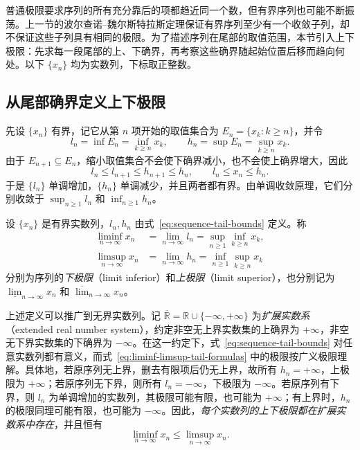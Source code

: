 普通极限要求序列的所有充分靠后的项都趋近同一个数，但有界序列也可能不断振荡。上一节的波尔查诺--魏尔斯特拉斯定理保证有界序列至少有一个收敛子列，却不保证这些子列具有相同的极限。为了描述序列在尾部的取值范围，本节引入上下极限：先求每一段尾部的上、下确界，再考察这些确界随起始位置后移而趋向何处。以下 $\{x_n\}$ 均为实数列，下标取正整数。

\subsection{从尾部确界定义上下极限}
\label{subsec:liminf-limsup-definitions}

先设 $\{x_n\}$ 有界，记它从第 $n$ 项开始的取值集合为 $E_n=\{x_k:k\geq n\}$，并令
\begin{equation}
    l_n=\inf E_n=\inf_{k\geq n}x_k,
    \qquad h_n=\sup E_n=\sup_{k\geq n}x_k.
    \label{eq:sequence-tail-bounds}
\end{equation}
由于 $E_{n+1}\subseteq E_n$，缩小取值集合不会使下确界减小，也不会使上确界增大，因此
\[
    l_n\leq l_{n+1}\leq h_{n+1}\leq h_n,
    \qquad l_n\leq x_n\leq h_n.
\]
于是 $\{l_n\}$ 单调增加，$\{h_n\}$ 单调减少，并且两者都有界。由单调收敛原理，它们分别收敛于 $\sup_{n\geq1}l_n$ 和 $\inf_{n\geq1}h_n$。

\begin{definition}
\label{def:liminf-limsup}
设 $\{x_n\}$ 是有界实数列，$l_n,h_n$ 由式~\eqref{eq:sequence-tail-bounds} 定义。称
\begin{equation}
    \begin{aligned}
        \liminf_{n\to\infty}x_n
        &=\lim_{n\to\infty}l_n
        =\sup_{n\geq1}\inf_{k\geq n}x_k,\\
        \limsup_{n\to\infty}x_n
        &=\lim_{n\to\infty}h_n
        =\inf_{n\geq1}\sup_{k\geq n}x_k
    \end{aligned}
    \label{eq:liminf-limsup-tail-formulas}
\end{equation}
分别为序列的\emph{下极限}（limit inferior）和\emph{上极限}（limit superior），也分别记为 $\underline{\lim}_{n\to\infty}x_n$ 和 $\overline{\lim}_{n\to\infty}x_n$。
\end{definition}

上述定义可以推广到无界实数列。记 $\overline{\mathbb{R}}=\mathbb{R}\cup\{-\infty,+\infty\}$ 为\emph{扩展实数系}（extended real number system），约定非空无上界实数集的上确界为 $+\infty$，非空无下界实数集的下确界为 $-\infty$。在这一约定下，式~\eqref{eq:sequence-tail-bounds} 对任意实数列都有意义，而式~\eqref{eq:liminf-limsup-tail-formulas} 中的极限按广义极限理解。具体地，若原序列无上界，删去有限项后仍无上界，故所有 $h_n=+\infty$，上极限为 $+\infty$；若原序列无下界，则所有 $l_n=-\infty$，下极限为 $-\infty$。若原序列有下界，则 $l_n$ 为单调增加的实数列，其极限可能有限，也可能为 $+\infty$；有上界时，$h_n$ 的极限同理可能有限，也可能为 $-\infty$。因此，\emph{每个实数列的上下极限都在扩展实数系中存在}，并且恒有
\begin{equation}
    \liminf_{n\to\infty}x_n\leq\limsup_{n\to\infty}x_n.
    \label{eq:liminf-le-limsup}
\end{equation}


